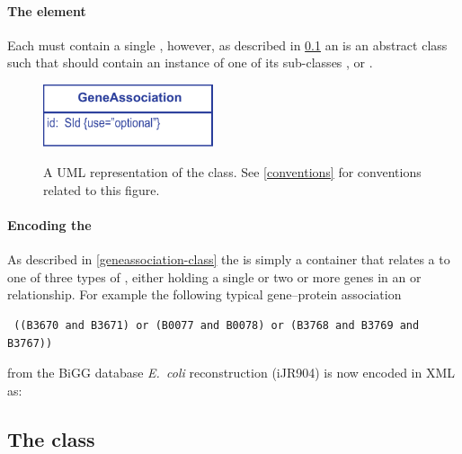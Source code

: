 
\paragraph{The  element}
Each \GeneAssociation must contain a single \Association, however, as described in \ref{association-class} an \Association is an abstract class such that  should contain an instance of one of its sub-classes \GeneAnd, \GeneOr or \Gene.

\begin{figure}[h!]
  \centering
  \includegraphics[width=5cm]{images/fbc_uml_ga.pdf}\\
  \caption{A UML representation of the \FBCPackage \GeneAssociation class. See  \ref{conventions} for conventions related to this figure.}
  \label{fig:fbc_uml_ga}
\end{figure}

\paragraph{Encoding the \GeneAssociation}
As described in \ref{geneassociation-class} the \GeneAssociation is simply a container that relates a \Reaction to one of three types of \Association, either holding a single \Gene or two or more genes in an \GeneAnd or \GeneOr relationship. For example the following typical gene--protein association
%
\begin{verbatim}
 ((B3670 and B3671) or (B0077 and B0078) or (B3768 and B3769 and B3767))
\end{verbatim}
%
from the BiGG database \emph{E.~coli} reconstruction (iJR904) \cite{ijr904, bigg} is now encoded in XML as:
%

\subsection{The \FBC {} class}
\label{association-class}


